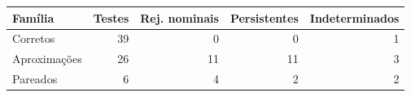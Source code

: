 \begin{tabular}{lrrrr}
\hline
Família & Testes & Rej. nominais & Persistentes & Indeterminados \\
\hline
Corretos & 39 & 0 & 0 & 1 \\
Aproximações & 26 & 11 & 11 & 3 \\
Pareados & 6 & 4 & 2 & 2 \\
\hline
\end{tabular}
